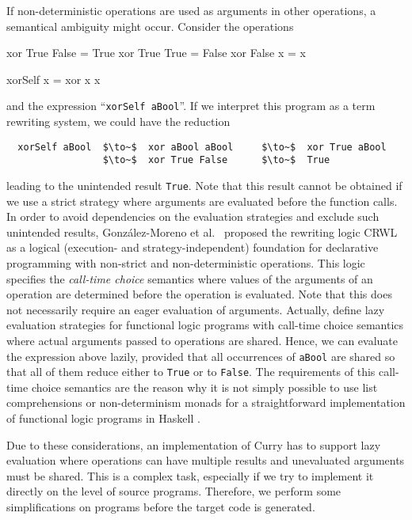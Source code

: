 \documentclass{llncs}
\newcommand{\code}[1]{\mbox{\small\texttt{#1}}}
\newcommand{\ccode}[1]{``\code{#1}''}
\begin{document}
If non-deterministic operations are used as arguments in other operations,
a semantical ambiguity might occur. Consider the operations
%
\begin{curry}
  xor True  False = True
  xor True  True  = False
  xor False x     = x

  xorSelf x = xor x x
\end{curry}
%
and the expression \ccode{xorSelf aBool}.
If we interpret this program as a term rewriting system,
we could have the reduction
\begin{lstlisting}
  xorSelf aBool  $\to~$  xor aBool aBool     $\to~$  xor True aBool
                 $\to~$  xor True False      $\to~$  True
\end{lstlisting}
leading to the unintended result \code{True}.
Note that this result cannot be obtained if we use a strict strategy
where arguments are evaluated before the function calls.
In order to avoid dependencies on the evaluation strategies
and exclude such unintended results,
Gonz\'alez-Moreno et al.\ \cite{GonzalezEtAl99} proposed
the rewriting logic CRWL as a logical
(execution- and strategy-independent) foundation for declarative
programming with non-strict and non-deterministic operations.  This
logic specifies the \emph{call-time choice} semantics \cite{Hussmann92}
\label{ctc-semantics}
where values of the arguments of an operation are determined before the
operation is evaluated. Note that this does not necessarily require
an eager evaluation of arguments.
Actually, \cite{AlbertHanusHuchOliverVidal05,LopezRodriguezSanchez07}
define lazy evaluation strategies for functional logic programs
with call-time choice semantics where actual arguments passed to
operations are shared. Hence, we can evaluate the expression above
lazily, provided that all occurrences of \code{aBool}
are shared so that all of them reduce either to \code{True} or to \code{False}.
The requirements of this call-time choice semantics are the
reason why it is not simply possible to use list comprehensions
or non-determinism monads for a straightforward implementation
of functional logic programs in Haskell \cite{FischerKiselyovShan09}.

Due to these considerations, an implementation of Curry
has to support lazy evaluation where operations can have multiple results
and unevaluated arguments must be shared.
This is a complex task, especially if we try to implement it directly
on the level of source programs. Therefore, we perform some
simplifications on programs before the target code is generated.
\end{document}
